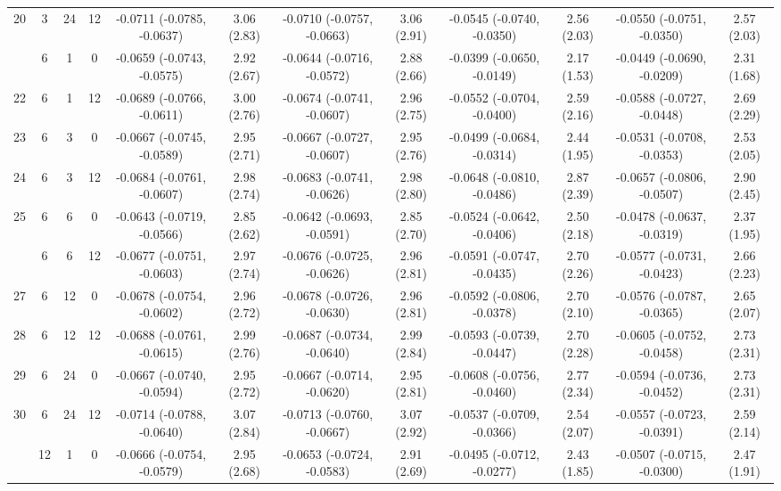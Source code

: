 \begin{table}[!h]
{\begin{tabular}[t]{cccccccccccc}
20 & 3 & 24 & 12 & -0.0711 (-0.0785, -0.0637) & 3.06 (2.83) & -0.0710 (-0.0757, -0.0663) & 3.06 (2.91) & -0.0545 (-0.0740, -0.0350) & 2.56 (2.03) & -0.0550 (-0.0751, -0.0350) & 2.57 (2.03)\\
\addlinespace
21 & 6 & 1 & 0 & -0.0659 (-0.0743, -0.0575) & 2.92 (2.67) & -0.0644 (-0.0716, -0.0572) & 2.88 (2.66) & -0.0399 (-0.0650, -0.0149) & 2.17 (1.53) & -0.0449 (-0.0690, -0.0209) & 2.31 (1.68)\\
22 & 6 & 1 & 12 & -0.0689 (-0.0766, -0.0611) & 3.00 (2.76) & -0.0674 (-0.0741, -0.0607) & 2.96 (2.75) & -0.0552 (-0.0704, -0.0400) & 2.59 (2.16) & -0.0588 (-0.0727, -0.0448) & 2.69 (2.29)\\
23 & 6 & 3 & 0 & -0.0667 (-0.0745, -0.0589) & 2.95 (2.71) & -0.0667 (-0.0727, -0.0607) & 2.95 (2.76) & -0.0499 (-0.0684, -0.0314) & 2.44 (1.95) & -0.0531 (-0.0708, -0.0353) & 2.53 (2.05)\\
24 & 6 & 3 & 12 & -0.0684 (-0.0761, -0.0607) & 2.98 (2.74) & -0.0683 (-0.0741, -0.0626) & 2.98 (2.80) & -0.0648 (-0.0810, -0.0486) & 2.87 (2.39) & -0.0657 (-0.0806, -0.0507) & 2.90 (2.45)\\
25 & 6 & 6 & 0 & -0.0643 (-0.0719, -0.0566) & 2.85 (2.62) & -0.0642 (-0.0693, -0.0591) & 2.85 (2.70) & -0.0524 (-0.0642, -0.0406) & 2.50 (2.18) & -0.0478 (-0.0637, -0.0319) & 2.37 (1.95)\\
\addlinespace
26 & 6 & 6 & 12 & -0.0677 (-0.0751, -0.0603) & 2.97 (2.74) & -0.0676 (-0.0725, -0.0626) & 2.96 (2.81) & -0.0591 (-0.0747, -0.0435) & 2.70 (2.26) & -0.0577 (-0.0731, -0.0423) & 2.66 (2.23)\\
27 & 6 & 12 & 0 & -0.0678 (-0.0754, -0.0602) & 2.96 (2.72) & -0.0678 (-0.0726, -0.0630) & 2.96 (2.81) & -0.0592 (-0.0806, -0.0378) & 2.70 (2.10) & -0.0576 (-0.0787, -0.0365) & 2.65 (2.07)\\
28 & 6 & 12 & 12 & -0.0688 (-0.0761, -0.0615) & 2.99 (2.76) & -0.0687 (-0.0734, -0.0640) & 2.99 (2.84) & -0.0593 (-0.0739, -0.0447) & 2.70 (2.28) & -0.0605 (-0.0752, -0.0458) & 2.73 (2.31)\\
29 & 6 & 24 & 0 & -0.0667 (-0.0740, -0.0594) & 2.95 (2.72) & -0.0667 (-0.0714, -0.0620) & 2.95 (2.81) & -0.0608 (-0.0756, -0.0460) & 2.77 (2.34) & -0.0594 (-0.0736, -0.0452) & 2.73 (2.31)\\
30 & 6 & 24 & 12 & -0.0714 (-0.0788, -0.0640) & 3.07 (2.84) & -0.0713 (-0.0760, -0.0667) & 3.07 (2.92) & -0.0537 (-0.0709, -0.0366) & 2.54 (2.07) & -0.0557 (-0.0723, -0.0391) & 2.59 (2.14)\\
\addlinespace
31 & 12 & 1 & 0 & -0.0666 (-0.0754, -0.0579) & 2.95 (2.68) & -0.0653 (-0.0724, -0.0583) & 2.91 (2.69) & -0.0495 (-0.0712, -0.0277) & 2.43 (1.85) & -0.0507 (-0.0715, -0.0300) & 2.47 (1.91)\\

\end{tabular}}
\end{table}
